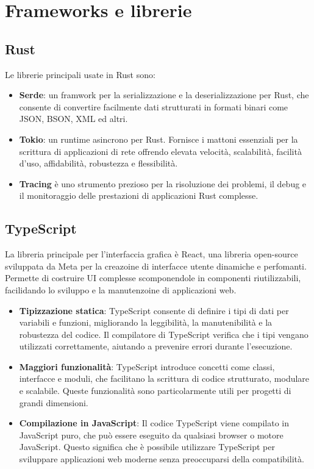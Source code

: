 \documentclass[target=bach,aauheader=,style=]{thud}
\begin{document}
\section{Frameworks e librerie}
\subsection{Rust}
Le librerie principali usate in Rust sono:
\begin{itemize}
  \item \textbf{Serde}: un framwork per la serializzazione e la deserializzazione per Rust, che consente di convertire facilmente dati strutturati in formati binari come JSON, BSON, XML ed altri. 
  \item \textbf{Tokio}: un runtime asincrono per Rust. Fornisce i mattoni essenziali per la scrittura di applicazioni di rete offrendo elevata velocità, scalabilità, facilità d'uso, affidabilità, robustezza e flessibilità.
  \item \textbf{Tracing} è uno strumento prezioso per la risoluzione dei problemi, il debug e il monitoraggio delle prestazioni di applicazioni Rust complesse.
\end{itemize}

\subsection{TypeScript}
La libreria principale per l'interfaccia grafica è React, una libreria open-source sviluppata da Meta per la creazoine di interfacce utente dinamiche e perfomanti. 
Permette di costruire UI complesse scomponendole in componenti riutilizzabili, facilidando lo sviluppo e la manutenzoine di applicazioni web.

\begin{itemize}
  \item \textbf{Tipizzazione statica}: TypeScript consente di definire i tipi di dati per variabili e funzioni, migliorando la leggibilità, la manutenibilità e la robustezza del codice. Il compilatore di TypeScript verifica che i tipi vengano utilizzati correttamente, aiutando a prevenire errori durante l'esecuzione.
  \item \textbf{Maggiori funzionalità}: TypeScript introduce concetti come classi, interfacce e moduli, che facilitano la scrittura di codice strutturato, modulare e scalabile. Queste funzionalità sono particolarmente utili per progetti di grandi dimensioni.
  \item \textbf{Compilazione in JavaScript}: Il codice TypeScript viene compilato in JavaScript puro, che può essere eseguito da qualsiasi browser o motore JavaScript. Questo significa che è possibile utilizzare TypeScript per sviluppare applicazioni web moderne senza preoccuparsi della compatibilità.
\end{itemize}
\end{document}
